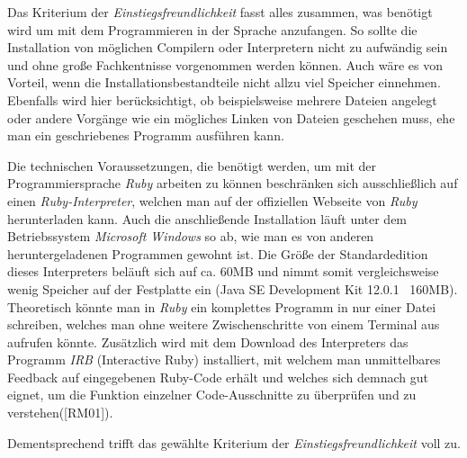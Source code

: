 \documentclass[12pt,DIV=14, version=first, BCOR=10mm,a4paper,twoside,parskip=half-,headsepline,headinclude]{scrartcl}
\begin{document}
\begin{flushleft}
Das Kriterium der \textit{Einstiegsfreundlichkeit} fasst alles zusammen, was benötigt wird um mit dem Programmieren in der Sprache anzufangen. So sollte die Installation von möglichen Compilern oder Interpretern nicht zu aufwändig sein und ohne große Fachkentnisse vorgenommen werden können. Auch wäre es von Vorteil, wenn die Installationsbestandteile nicht allzu viel Speicher einnehmen. Ebenfalls wird hier berücksichtigt, ob beispielsweise mehrere Dateien angelegt oder andere Vorgänge wie ein mögliches Linken von Dateien geschehen muss, ehe man ein geschriebenes Programm ausführen kann.

Die technischen Voraussetzungen, die benötigt werden, um mit der Programmiersprache \textit{\glqq Ruby\grqq} arbeiten zu können beschränken sich ausschließlich auf einen \textit{Ruby-Interpreter}, welchen man auf der offiziellen Webseite von \textit{\glqq Ruby\grqq} herunterladen kann. Auch die anschließende Installation läuft unter dem Betriebssystem \textit{Microsoft Windows} so ab, wie man es von anderen heruntergeladenen Programmen gewohnt ist. Die Größe der Standardedition dieses Interpreters beläuft sich auf ca. 60MB und nimmt somit vergleichsweise wenig Speicher auf der Festplatte ein (Java SE Development Kit 12.0.1 ~160MB).
Theoretisch könnte man in \textit{\glqq Ruby\grqq} ein komplettes Programm in nur einer Datei schreiben, welches man ohne weitere Zwischenschritte von einem Terminal aus aufrufen könnte. Zusätzlich wird mit dem Download des Interpreters das Programm \textit{IRB} (Interactive Ruby) installiert, mit welchem man unmittelbares Feedback auf eingegebenen Ruby-Code erhält und welches sich demnach gut eignet, um die Funktion einzelner Code-Ausschnitte zu überprüfen und zu verstehen([RM01]).

Dementsprechend trifft das gewählte Kriterium der \textit{Einstiegsfreundlichkeit} voll zu.
\end{flushleft}
\end{document}

